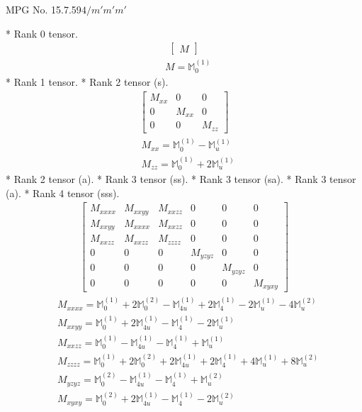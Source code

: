 \documentclass[fleqn,8pt,landscape]{jsarticle}
\begin{document}
\setcounter{MaxMatrixCols}{32}

\renewcommand{\tablename}{Table~}
\renewcommand{\figurename}{Figure~}
\begin{center}
\LARGE
MPG No. 15.7.59\quad$4/m'm'm'$
\end{center}
* Rank 0 tensor.
\begin{align*}
\begin{bmatrix} M \end{bmatrix}
\end{align*}
\begin{align*}
& M = \mathbb{M}_{0}^{(1)}
\end{align*}
* Rank 1 tensor.
* Rank 2 tensor (s).
\begin{align*}
\begin{bmatrix} M_{xx} & 0 & 0 \\ 0 & M_{xx} & 0 \\ 0 & 0 & M_{zz} \end{bmatrix}
\end{align*}
\begin{align*}
& M_{xx} = \mathbb{M}_{0}^{(1)} - \mathbb{M}_{u}^{(1)} \\
& M_{zz} = \mathbb{M}_{0}^{(1)} + 2 \mathbb{M}_{u}^{(1)}
\end{align*}
* Rank 2 tensor (a).
* Rank 3 tensor (ss).
* Rank 3 tensor (sa).
* Rank 3 tensor (a).
* Rank 4 tensor (sss).
\begin{align*}
\begin{bmatrix} M_{xxxx} & M_{xxyy} & M_{xxzz} & 0 & 0 & 0 \\ M_{xxyy} & M_{xxxx} & M_{xxzz} & 0 & 0 & 0 \\ M_{xxzz} & M_{xxzz} & M_{zzzz} & 0 & 0 & 0 \\ 0 & 0 & 0 & M_{yzyz} & 0 & 0 \\ 0 & 0 & 0 & 0 & M_{yzyz} & 0 \\ 0 & 0 & 0 & 0 & 0 & M_{xyxy} \end{bmatrix}
\end{align*}
\begin{align*}
& M_{xxxx} = \mathbb{M}_{0}^{(1)} + 2 \mathbb{M}_{0}^{(2)} - \mathbb{M}_{4u}^{(1)} + 2 \mathbb{M}_{4}^{(1)} - 2 \mathbb{M}_{u}^{(1)} - 4 \mathbb{M}_{u}^{(2)} \\
& M_{xxyy} = \mathbb{M}_{0}^{(1)} + 2 \mathbb{M}_{4u}^{(1)} - \mathbb{M}_{4}^{(1)} - 2 \mathbb{M}_{u}^{(1)} \\
& M_{xxzz} = \mathbb{M}_{0}^{(1)} - \mathbb{M}_{4u}^{(1)} - \mathbb{M}_{4}^{(1)} + \mathbb{M}_{u}^{(1)} \\
& M_{zzzz} = \mathbb{M}_{0}^{(1)} + 2 \mathbb{M}_{0}^{(2)} + 2 \mathbb{M}_{4u}^{(1)} + 2 \mathbb{M}_{4}^{(1)} + 4 \mathbb{M}_{u}^{(1)} + 8 \mathbb{M}_{u}^{(2)} \\
& M_{yzyz} = \mathbb{M}_{0}^{(2)} - \mathbb{M}_{4u}^{(1)} - \mathbb{M}_{4}^{(1)} + \mathbb{M}_{u}^{(2)} \\
& M_{xyxy} = \mathbb{M}_{0}^{(2)} + 2 \mathbb{M}_{4u}^{(1)} - \mathbb{M}_{4}^{(1)} - 2 \mathbb{M}_{u}^{(2)}
\end{align*}
\end{document}
